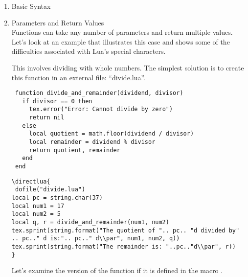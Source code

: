  \begin{enumerate}[label=(\alph*)]
  \item Basic Syntax

\begin{tkzexample}[latex=.4\textwidth]
\end{tkzexample}



  \item Parameters and Return Values\\

Functions can take any number of parameters and return multiple values. Let's look at an example that illustrates this case and shows some of the difficulties associated with Lua's special characters.

This involves dividing with whole numbers. The simplest solution 
is to create this function in an external file: “divide.lua”.

\begin{mybox}
\begin{verbatim}
 function divide_and_remainder(dividend, divisor)
   if divisor == 0 then
     tex.error("Error: Cannot divide by zero")
     return nil
   else
     local quotient = math.floor(dividend / divisor)
     local remainder = dividend % divisor
     return quotient, remainder
   end
 end 
\end{verbatim}
\end{mybox}

\begin{verbatim}
\directlua{
 dofile("divide.lua")
local pc = string.char(37)
local num1 = 17
local num2 = 5
local q, r = divide_and_remainder(num1, num2)
tex.sprint(string.format("The quotient of ".. pc.. "d divided by"
.. pc.." d is:".. pc.." d\\par", num1, num2, q))
tex.sprint(string.format("The remainder is: "..pc.."d\\par", r))
}
\end{verbatim}


Let's examine the version of the function if it is defined in the macro . 


\end{enumerate}
